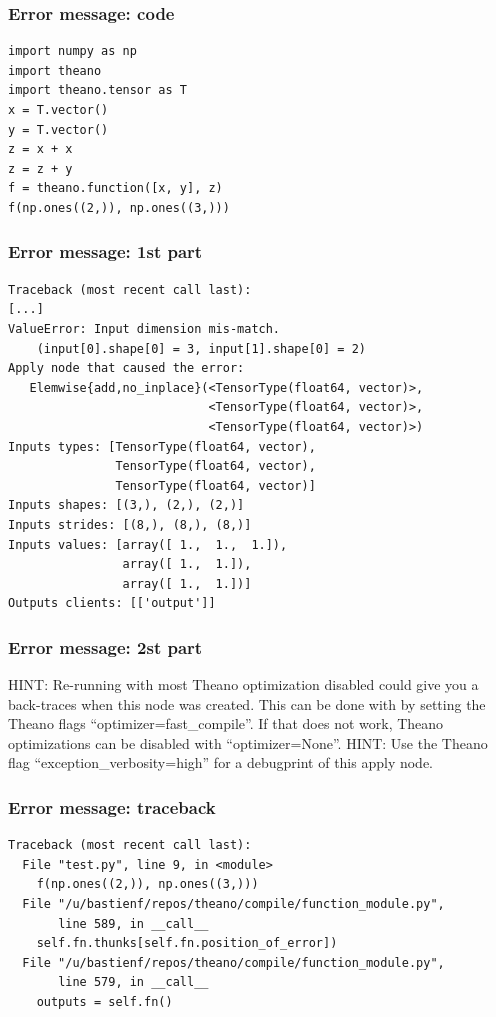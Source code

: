 \documentclass[utf8x,xcolor=pdftex,dvipsnames,table]{beamer}
\begin{document}
\begin{frame}[fragile]
  \frametitle{Error message: code}
\begin{lstlisting}
import numpy as np
import theano
import theano.tensor as T
x = T.vector()
y = T.vector()
z = x + x
z = z + y
f = theano.function([x, y], z)
f(np.ones((2,)), np.ones((3,)))
\end{lstlisting}
\end{frame}

\begin{frame}[fragile]
  \frametitle{Error message: 1st part}

\begin{lstlisting}
Traceback (most recent call last):
[...]
ValueError: Input dimension mis-match.
    (input[0].shape[0] = 3, input[1].shape[0] = 2)
Apply node that caused the error:
   Elemwise{add,no_inplace}(<TensorType(float64, vector)>,
                            <TensorType(float64, vector)>,
                            <TensorType(float64, vector)>)
Inputs types: [TensorType(float64, vector),
               TensorType(float64, vector),
               TensorType(float64, vector)]
Inputs shapes: [(3,), (2,), (2,)]
Inputs strides: [(8,), (8,), (8,)]
Inputs values: [array([ 1.,  1.,  1.]),
                array([ 1.,  1.]),
                array([ 1.,  1.])]
Outputs clients: [['output']]
\end{lstlisting}
\end{frame}

\begin{frame}[fragile]
  \frametitle{Error message: 2st part}
HINT: Re-running with most Theano optimization
disabled could give you a back-traces when this
node was created. This can be done with by setting
the Theano flags ``optimizer=fast\_compile''. If that does not
work, Theano optimizations can be disabled with
``optimizer=None''.\newline
HINT: Use the Theano flag ``exception\_verbosity=high''
for a debugprint of this apply node.
\end{frame}


\begin{frame}[fragile]
  \frametitle{Error message: traceback}

\begin{lstlisting}
Traceback (most recent call last):
  File "test.py", line 9, in <module>
    f(np.ones((2,)), np.ones((3,)))
  File "/u/bastienf/repos/theano/compile/function_module.py",
       line 589, in __call__
    self.fn.thunks[self.fn.position_of_error])
  File "/u/bastienf/repos/theano/compile/function_module.py",
       line 579, in __call__
    outputs = self.fn()
\end{lstlisting}
\end{frame}
\end{document}
